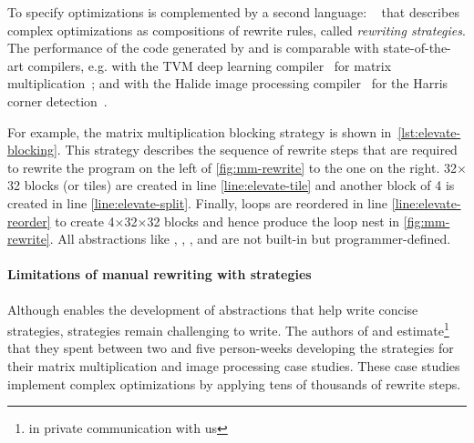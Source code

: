 To specify optimizations \Rise{} is complemented by a second language: \Elevate{}~\cite{hagedorn2020-elevate} that describes complex optimizations as compositions of rewrite rules, called \emph{rewriting strategies}.
The performance of the code generated by \Rise{} and \Elevate{} is comparable with state-of-the-art compilers, e.g. with the TVM  deep learning compiler~\cite{chen2018-tvm} for matrix multiplication~\cite{hagedorn2020-elevate}; and with the Halide image processing compiler~\cite{halide-2012} for the Harris corner detection~\cite{koehler2021-elevate-imgproc}.

For example, the \Elevate{} matrix multiplication blocking strategy is shown in~\cref{lst:elevate-blocking}.
This strategy describes the sequence of rewrite steps that are required to rewrite the \Rise{} program on the left of \cref{fig:mm-rewrite} to the one on the right.
32$\times$32 blocks (or tiles) are created in line \ref{line:elevate-tile} and another block of 4 is created in line \ref{line:elevate-split}.
Finally, loops are reordered in line \ref{line:elevate-reorder} to create 4$\times$32$\times$32 blocks and hence produce the loop nest in \cref{fig:mm-rewrite}.
All abstractions like , , ,  and  are not built-in but programmer-defined.

\paragraph{Limitations of manual rewriting with strategies}
Although \Elevate{} enables the development of abstractions that help write concise strategies, strategies remain challenging to write.
The authors of \cite{hagedorn2020-elevate} and \cite{koehler2021-elevate-imgproc} estimate\footnote{in private communication with us} that they spent between two and five person-weeks developing the \Elevate{} strategies for their matrix multiplication and image processing case studies.
These case studies implement complex optimizations by applying tens of thousands of rewrite steps.

